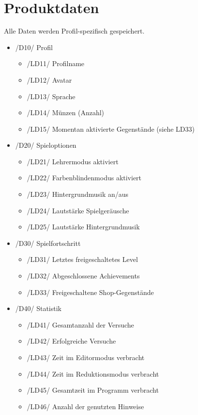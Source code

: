 \section{Produktdaten}

Alle Daten werden Profil-spezifisch gespeichert.

\begin{itemize}

\item /D10/ Profil
\begin{itemize}
\item /LD11/ Profilname
\item /LD12/ Avatar
\item /LD13/ Sprache
\item /LD14/ Münzen (Anzahl)
\item /LD15/ Momentan aktivierte Gegenstände (siehe LD33)
\end{itemize}

\item /D20/ Spieloptionen
\begin{itemize}
\item /LD21/ Lehrermodus aktiviert
\item /LD22/ Farbenblindenmodus aktiviert
\item /LD23/ Hintergrundmusik an/aus
\item /LD24/ Lautstärke Spielgeräusche
\item /LD25/ Lautstärke Hintergrundmusik
\end{itemize}

\item /D30/ Spielfortschritt
\begin{itemize}
\item /LD31/ Letztes freigeschaltetes Level
\item /LD32/ Abgeschlossene Achievements
\item /LD33/ Freigeschaltene Shop-Gegenstände
\end{itemize}

\item /D40/ Statistik
\begin{itemize}
\item /LD41/ Gesamtanzahl der Versuche
\item /LD42/ Erfolgreiche Versuche
\item /LD43/ Zeit im Editormodus verbracht
\item /LD44/ Zeit im Reduktionsmodus verbracht
\item /LD45/ Gesamtzeit im Programm verbracht
\item /LD46/ Anzahl der genutzten Hinweise
\end{itemize}

\end{itemize}
